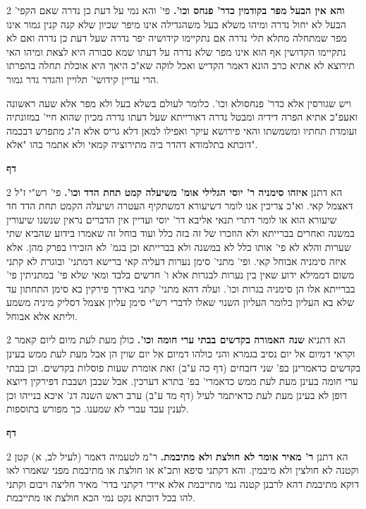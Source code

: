 \documentclass[12pt, openany]{book}
\newcommand{\sethebfont}{
\fontsize{10.5pt}{21.0pt} \selectfont
}
\newcommand{\twocol}[1]{
	{\sethebfont \begin{multicols}{2}
			#1
	\end{multicols}}	
}
\newcommand{\chapname}{}
\newcommand{\newchap}[1]{
	\addcontentsline{toc}{chapter}{#1}
	\renewcommand{\chapname}{#1}
		\begin{center}
			\textbf{%
\fontsize{16pt}{16pt}\selectfont
				#1}
		\end{center}
}
\begin{document}
\twocol{\textbf{והא אין הבעל מפר בקודמין כדר' פנחס וכו'.}  פי' והא נמי על דעת כן נדרה שאם הקפי' הבעל לא יחול נדרה ומיהו משלא בעל משהגדילה אינו מיפר שכיון שלא קנה קנין גמור אינו מפר שמתחלה מתלא תלי נדרה אם נתקיימו קידושיה יפר נדרה שעל דעת כן נדרה ואם לא נתקיימו הקדושין אף הוא אינו מפר שלא נדרה על דעתו שמא סבורה היא לצאת ומיהו האי תירוצא לא אתיא כרב הונא דאמר הקדיש ואכל לוקה שא"כ היאך היא אוכלת תחלה בהפרתו הרי עדיין קידושי' תלויין והגדר גדר גמור.\par ויש שגורסין אלא כדר' פנחסולא וכו'. כלומר לעולם בשלא בעל ולא מפר אלא שעה ראשונה ואעפ"כ אתיא הפרה דידיה ומבטל נדרה דאורייתא שעל דעתו נדרה מכיון שהוא חיי' במזונתיה ועומדת תחתיו ומשמשתו והאי פירושא עיקר ואפילו למאן דלא גריס אלא ה"ג מתפרש דבכמה דוכתא בתלמודא דהדר ביה מתירוציה קמאי ולא אתמר בהו "אלא". 
\par}
\newchap{דף }
\twocol{הא דתנן \textbf{איזהו סימניה ר' יוסי הגלילי אומ' משיעלה קמט תחת הדד וכו'.}  פי' רש"י ז"ל דאצמל קאי. וא"כ צריכין אנו לומר דשיעורא דמשתקיף העטרה ושיעלה הקמט תחת הדד חד שיעורא הוא או לומר דתרי תנאי אליבא דר' יוסי ועדיין אין הדברים נראין שנשנו שיעורין במשנה ואחרים בברייתא ולא הוזכרו של זה בזה כלל ועוד בוחל זה שאמרו בידוע שהביא שתי שערות והלא לא פי' אותו כלל לא במשנה ולא בברייתא וכן בגמ' לא הזכירו בפרק מהן. אלא איזה סימניה אבוחל קאי. ופי' מתני' סימן נערות דעליה קאי ברישא דמתני' ובוגרת לא קתני משום דממילא ידוע שאין בין נערות לבגרות אלא ו' חדשים בלבד ומאי שלא פי' במתניתין פי' בברייתא אלו הן סימניה בגרות וכו'. ועלה דהא מתני' קתני באידך פירקין בא סימן התחתון עד שלא בא העליון כלומר העליון השנוי שאלו לדברי רש"י סימן עליון אצמל דסליק מיניה משמע וליתא אלא אבוחל. 
\par}
\twocol{הא דתניא \textbf{שנה האמורה בקדשים בבתי ערי חומה וכו'.}  כולן מעת לעת מיום ליום קאמר וקראי דמיום אל יום נסיב בגמרא והני כולהו דמיום אל יום שוין הן אבל מעת לעת ממש בעינן בקדשים כדאמרינן בפ' שני דזבחים (דף כה ע"ב) זאת אומרת שעות פוסלות בקדשים. וכן בבתי ערי חומה בעינן מעת לעת ממש כדאמרי' בפ' בתרא דערכין. אבל שבבן ושבבת דפירקין דיוצא דופן לא בעינן מעת לעת כדאיתמר לעיל (דף מד ע"ב) ערב ראש השנה דג' איכא בנייהו וכן לענין עבד עברי לא שמענו. כך מפורש בתוספות. 
\par}
\newchap{דף }
\twocol{הא דתנן \textbf{ר' מאיר אומר לא חולצת ולא מתיבמת.}  ר"מ לטעמיה דאמר (לעיל לב, א) קטן וקטנה לא חולצין ולא מיבמין. והא דקתני סיפא ותכ"א או חולצת או מתיבמת מפני שאמרו לאו דוקא מתיבמת דהא לרבנן קטנה נמי מתייבמת אלא איידי דקתני בדר' מאיר חליצה ויבום וקתני להו בכל דוכתא נקט נמי הכא חולצת או מתייבמת. 
\par}
\end{document}
